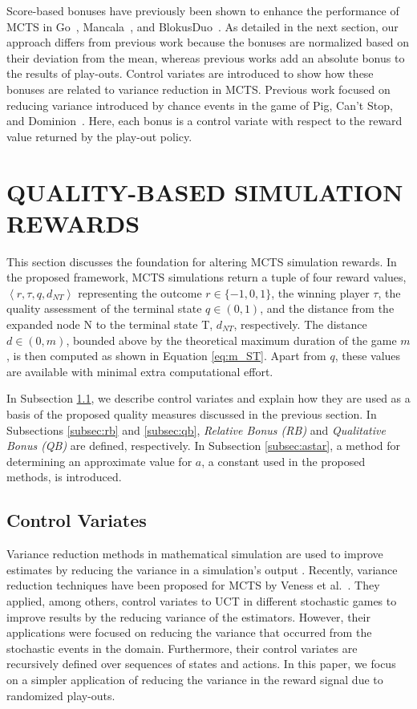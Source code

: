 \documentclass{ecai2014}
\newcommand{\tuple}[1]{\ensuremath{\left \langle #1 \right \rangle }}
\newcommand{\node}[1]{{\fontfamily{phv}\selectfont#1}}
\begin{document}
Score-based bonuses have previously been shown to enhance the performance of MCTS in Go~{\cite{Enzenberger10Fuego,xie2009backpropagation}}, Mancala~{\cite{Ramanujan}}, and BlokusDuo~{\cite{shibahara2008combining}}. As detailed in the next section, our approach differs from previous work because the bonuses are normalized based on their deviation from the mean, whereas previous works add an absolute bonus to the results of play-outs. Control variates are introduced to show how these bonuses are related to variance reduction in MCTS. Previous work focused on reducing variance introduced by chance events in the game of Pig, Can’t Stop, and Dominion~{\cite{Veness11variance}}. Here, each bonus is a control variate with respect to the reward value returned by the play-out policy.

\section{QUALITY-BASED SIMULATION REWARDS}
\label{sec:qoreward}
This section discusses the foundation for altering MCTS simulation rewards. In the proposed framework, MCTS simulations return a tuple of four reward values, $\tuple{r,\tau,q,d_{NT}}$ representing the outcome $r\in\{-1, 0, 1\}$, the winning player $\tau$, the quality assessment of the terminal state $q\in(0, 1)$, and the distance from the expanded node \node{N} to the terminal state \node{T}, $d_{NT}$, respectively. The distance $d\in(0, m)$, bounded above by the theoretical maximum duration of the game $m$, is then computed as shown in Equation \ref{eq:m_ST}. Apart from $q$, these values are available with minimal extra computational effort.

In Subsection \ref{sub:cv}, we describe control variates and explain how they are used as a basis of the proposed quality measures discussed in the previous section. In Subsections \ref{subsec:rb} and \ref{subsec:qb}, \emph{Relative Bonus (RB)} and \emph{Qualitative Bonus (QB)} are defined, respectively. In Subsection \ref{subsec:astar}, a method for determining an approximate value for $a$, a constant used in the proposed methods, is introduced.

\subsection{Control Variates}
\label{sub:cv}
Variance reduction methods in mathematical simulation are used to improve estimates by reducing the variance in a simulation's output \cite{kelton2000simulation}. Recently, variance reduction techniques have been proposed for MCTS by Veness et al.~\cite{Veness11variance}. They applied, among others, control variates to UCT in different stochastic games to improve results by the reducing variance of the estimators. However, their applications were focused on reducing the variance that occurred from the stochastic events in the domain. Furthermore, their control variates are recursively defined over sequences of states and actions. In this paper, we focus on a simpler application of reducing the variance in the reward signal due to randomized play-outs.  
\end{document}
